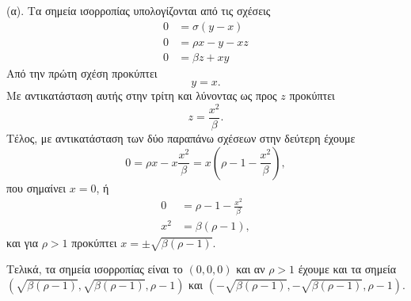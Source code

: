 \begin{solution}
    (α). Τα σημεία ισορροπίας υπολογίζονται από τις σχέσεις
    \begin{align*}
        0 &= \sigma(y - x) \\
        0 &= \rho x - y - xz \\
        0 &= \beta z + xy
    \end{align*}
    Από την πρώτη σχέση προκύπτει
    \[
        y = x.
    \]
    Με αντικατάσταση αυτής στην τρίτη
    και λύνοντας ως προς \( z \) προκύπτει
    \[
        z = \frac{x^2}{\beta}.
    \]
    Τέλος, με αντικατάσταση των δύο παραπάνω σχέσεων στην δεύτερη έχουμε
    \[
        0 = \rho x - x \frac{x^2}{\beta} = x \left( \rho -1 - \frac{x^2}{\beta}
        \right),
    \]
    που σημαίνει \( x = 0 \), ή
    \begin{align*}
        0 &= \rho -1 - \frac{x^2}{\beta} \\
        x^2 &= \beta(\rho - 1),
    \end{align*}
    και για \( \rho > 1 \) προκύπτει \( x = \pm\sqrt{\beta(\rho - 1)} \).

    Τελικά, τα σημεία ισορροπίας είναι το \( \left(0, 0, 0\right) \) και αν \( \rho > 1 \) έχουμε
    και τα σημεία \( \left(\sqrt{\beta(\rho - 1)}, \sqrt{\beta(\rho - 1)}, \rho
    -1\right) \) και \( \left( -\sqrt{\beta(\rho - 1)}, -\sqrt{\beta(\rho - 1)},
    \rho -1 \right) \).


\end{solution}
